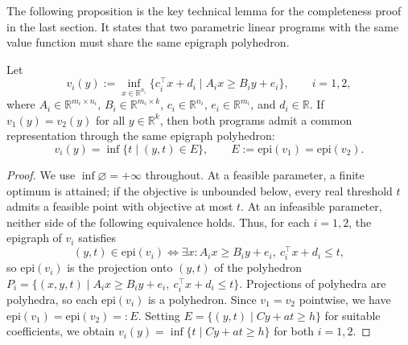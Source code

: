 The following proposition is the key technical lemma for the completeness
proof in the last section. It states that two parametric linear programs
with the same value function must share the same epigraph polyhedron.

\begin{proposition}\label{prop:equalepi}
Let
\[
v_i(y) := \inf_{x\in\mathbb{R}^{n_i}}\{c_i^\top x+d_i \mid A_i x \ge B_i y+e_i\},
\qquad i=1,2,
\]
where $A_i \in \mathbb{R}^{m_i \times n_i}$,
$B_i \in \mathbb{R}^{m_i \times k}$, $c_i\in\mathbb{R}^{n_i}$,
$e_i\in\mathbb{R}^{m_i}$, and $d_i\in\mathbb{R}$. If $v_1(y) = v_2(y)$ for all
$y \in \mathbb{R}^k$, then both programs admit a common representation
through the same epigraph polyhedron:
\[
v_i(y) = \inf\{t \mid (y,t) \in E\},
\qquad
E := \mathrm{epi}(v_1) = \mathrm{epi}(v_2).
\]
\end{proposition}

\begin{proof}
We use $\inf\varnothing=+\infty$ throughout.
At a feasible parameter, a finite optimum is attained; if the objective
is unbounded below, every real threshold $t$ admits a feasible point
with objective at most $t$. At an infeasible parameter, neither side
of the following equivalence holds. Thus, for each $i = 1,2$,
the epigraph of $v_i$ satisfies
\[
(y,t) \in \mathrm{epi}(v_i)
\iff
\exists x : A_i x \ge B_i y+e_i,\ c_i^\top x+d_i \le t,
\]
so $\mathrm{epi}(v_i)$ is the projection onto $(y,t)$ of the polyhedron
$P_i = \{(x,y,t) \mid A_i x \ge B_i y+e_i,\ c_i^\top x+d_i \le t\}$.
Projections of polyhedra are polyhedra, so each $\mathrm{epi}(v_i)$ is
a polyhedron. Since $v_1 = v_2$ pointwise, we have
$\mathrm{epi}(v_1) = \mathrm{epi}(v_2) =: E$.
Setting $E = \{(y,t) \mid Cy + at \ge h\}$ for suitable coefficients, we obtain
$v_i(y) = \inf\{t \mid Cy + at \ge h\}$ for both $i = 1, 2$.
\end{proof}

